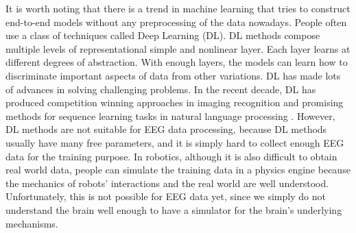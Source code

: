 \documentclass[a4paper,11pt,oneside]{article}
\begin{document}
It is worth noting that there is a trend in machine learning that tries to construct end-to-end models without any preprocessing of the data nowadays. People often use a class of techniques called Deep Learning (DL).  DL methods compose multiple levels of representational simple and nonlinear layer. Each layer learns at different degrees of abstraction. With enough layers, the models can learn how to discriminate important aspects of data from other variations. DL has made lots of advances in solving challenging problems. In the recent decade, DL has produced competition winning approaches in imaging recognition \cite{krizhevsky2012imagenet}\cite{farabet2013learning} and promising methods for sequence learning tasks in natural language processing \cite{bordes2014question} \cite{luong2014addressing}. However, DL methods are not suitable for EEG data processing, because DL methods usually have many free parameters, and it is simply hard to collect enough EEG data for the training purpose. In robotics, although it is also difficult to obtain real world data, people can simulate the training data in a physics engine because the mechanics of robots' interactions and the real world are well understood. Unfortunately, this is not possible for EEG data yet, since we simply do not understand the brain well enough to have a simulator for the brain's underlying mechanisms.
\end{document}
